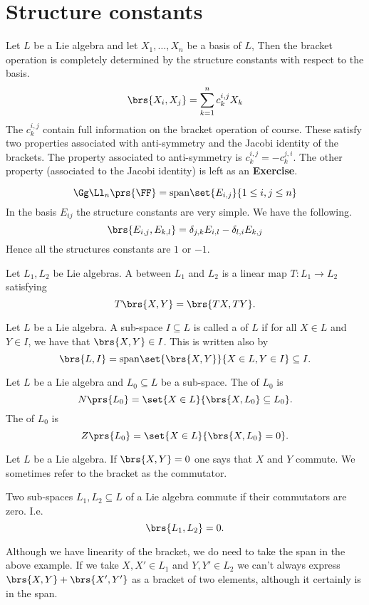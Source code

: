 \documentclass[10pt,a4paper,twoside,openany,hidelinks]{book}
\begin{document}
\section{Structure constants}
Let $L$ be a Lie algebra and let $X_1, \ldots, X_n$ be a basis of $L$, Then the bracket operation is completely determined by the structure constants with respect to the basis.
\[\brs{X_i, X_j} = \sum_{k=1}^n c_k^{i,j} X_k\]
The  $c_k^{i,j}$ contain full information on the bracket operation of course. These satisfy two properties associated with anti-symmetry and the Jacobi identity of the brackets.
The property associated to anti-symmetry is $c_k^{i,j} = -c_k^{j,i}$. The other property (associated to the Jacobi identity) is left as an \textbf{\textrm{Exercise}}.
\begin{example}
\[\Gg\Ll_n\prs{\FF} = \mathrm{span}\set{E_{i,j}}{1 \leq i,j\leq n}\]
In the basis $E_{ij}$ the structure constants are very simple. We have the following.
\[\brs{E_{i,j}, E_{k,l}} = \delta_{j,k}E_{i,l} - \delta_{l,i}E_{k,j}\]
Hence all the structures constants are $1$ or $-1$.
\end{example}
\begin{definition}
Let $L_1, L_2$ be Lie algebras. A  between $L_1$ and $L_2$ is a linear map $T \colon L_1 \to L_2$ satisfying
\[T\brs{X,Y} = \brs{TX, TY}\text{.}\]
\end{definition}
\begin{definition}
Let $L$ be a Lie algebra. A sub-space $I \subseteq L$ is called a  of $L$ if for all $X \in L$ and $Y \in I$, we have that $\brs{X,Y} \in I$. This is written also by 
\[\brs{L,I} = \mathrm{span}\set{\brs{X,Y}}{X \in L, Y \in I} \subseteq I \text{.}\]
\end{definition}
\begin{definition}
Let $L$ be a Lie algebra and $L_0 \subseteq L$ be a sub-space. The  of $L_0$ is
\[N\prs{L_0} = \set{X \in L}{\brs{X,L_0} \subseteq L_0}\text{.}\]
The  of $L_0$ is
\[Z\prs{L_0} = \set{X \in L}{\brs{X,L_0} = 0} \text{.}\]
\end{definition}
\begin{definition}
Let $L$ be a Lie algebra. If $\brs{X,Y} = 0$ one says that $X$ and $Y$ commute.
We sometimes refer to the bracket as the commutator.
\end{definition}
\begin{example}
Two sub-spaces $L_1, L_2 \subseteq L$ of a Lie algebra commute if their commutators are zero. I.e.
\[\brs{L_1, L_2} = 0 \text{.}\]
\end{example}
\begin{remark}
Although we have linearity of the bracket, we do need to take the span in the above example. If we take $X,X' \in L_1$ and $Y,Y' \in L_2$ we can't always express $\brs{X,Y} + \brs{X',Y'}$ as a bracket of two elements, although it certainly is in the span.
\end{remark}
\end{document}
